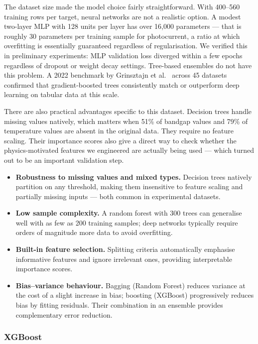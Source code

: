 The dataset size made the model choice fairly straightforward.
With 400--560 training rows per target, neural networks are not a realistic option.
A modest two-layer MLP with 128 units per layer has over 16,000 parameters ---
that is roughly 30 parameters per training sample for photocurrent,
a ratio at which overfitting is essentially guaranteed regardless of regularisation.
We verified this in preliminary experiments: MLP validation loss diverged within
a few epochs regardless of dropout or weight decay settings.
Tree-based ensembles do not have this problem.
A 2022 benchmark by Grinsztajn et al.~\cite{grinsztajn2022tree} across 45 datasets
confirmed that gradient-boosted trees consistently match or outperform deep learning
on tabular data at this scale.

There are also practical advantages specific to this dataset.
Decision trees handle missing values natively, which matters when 51\% of bandgap
values and 79\% of temperature values are absent in the original data.
They require no feature scaling.
Their importance scores also give a direct way to check whether the
physics-motivated features we engineered are actually being used ---
which turned out to be an important validation step.

\begin{itemize}
  \item \textbf{Robustness to missing values and mixed types.}
        Decision trees natively partition on any threshold, making them
        insensitive to feature scaling and partially missing inputs --- both
        common in experimental datasets.
  \item \textbf{Low sample complexity.}
        A random forest with 300 trees can generalise well with as few as
        200 training samples; deep networks typically require orders of
        magnitude more data to avoid overfitting.
  \item \textbf{Built-in feature selection.}
        Splitting criteria automatically emphasise informative features and
        ignore irrelevant ones, providing interpretable importance scores.
  \item \textbf{Bias--variance behaviour.}
        Bagging (Random Forest) reduces variance at the cost of a slight
        increase in bias; boosting (XGBoost) progressively reduces bias by
        fitting residuals. Their combination in an ensemble provides
        complementary error reduction.
\end{itemize}

\subsubsection{XGBoost}

